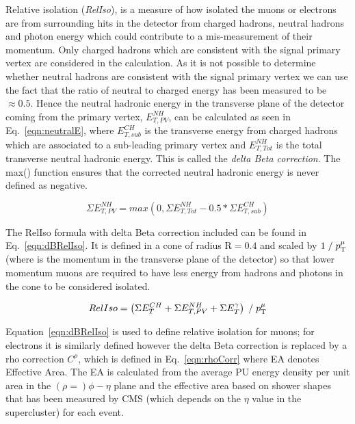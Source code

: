 Relative isolation (\emph{RelIso}), is a measure of how isolated the muons or electrons are from surrounding hits in the detector from charged hadrons, neutral hadrons and photon energy which could contribute to a mis-measurement of their momentum. Only charged hadrons which are consistent with the signal primary vertex are considered in the calculation. As it is not possible to determine whether neutral hadrons are consistent with the signal primary vertex we can use the fact that the ratio of neutral to charged energy has been measured to be $\approx 0.5$. Hence the neutral hadronic energy in the transverse plane of the detector coming from the primary vertex, $E_{T,PV}^{NH}$, can be calculated as seen in Eq.~\ref{eqn:neutralE}, where $E_{T,sub}^{CH}$ is the transverse energy from charged hadrons which are associated to a sub-leading primary vertex and $E_{T,Tot}^{NH}$ is the total transverse neutral hadronic energy. This is called the \emph{delta Beta correction}. The max() function ensures that the corrected neutral hadronic energy is never defined as negative.


\begin{centering}
\begin{equation}
\Sigma E_{T,PV}^{NH}  =  max(0, \Sigma E_{T,Tot}^{NH} - 0.5*\Sigma E_{T,sub}^{CH})
\label{eqn:neutralE}
\end{equation}
\end{centering}



The RelIso formula with delta Beta correction included can be found in Eq.~\ref{eqn:dBRelIso}. It is defined in a cone of radius $\textrm{R}=0.4$ and scaled by $1\; / \;p_{\mathrm{T}}^{\mu}$ (where \pt is the momentum in the transverse plane of the detector) so that lower momentum muons are required to have less energy from hadrons and photons in the cone to be considered isolated.

\begin{centering}
\begin{equation}
RelIso = \left( \Sigma E_{T}^{CH} + \Sigma E_{T,PV}^{NH} +  \Sigma E_{T}^{\gamma} \right) \; / \;   p_{\mathrm{T}}^{\mu}
\label{eqn:dBRelIso}
\end{equation}
\end{centering}


Equation~\ref{eqn:dBRelIso} is used to define relative isolation for muons; for electrons it is similarly defined however the delta Beta correction is replaced by a rho correction $C^{\rho}$, which is defined in Eq.~\ref{eqn:rhoCorr} where EA denotes Effective Area. The EA is calculated from the average PU energy density per unit area in the $(\rho=)\phi-\eta$ plane and the effective area based on shower shapes that has been measured by CMS (which depends on the $\eta$ value in the supercluster) for each event.


